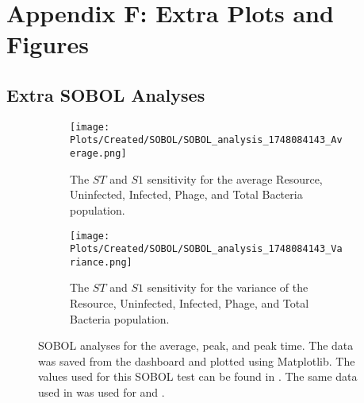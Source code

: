\chapter{Appendix F: Extra Plots and Figures}
\label{AppendixF}

\section{Extra SOBOL Analyses}
\label{sec:AppendixF:extra_SOBOL_analyses}

\begin{figure}[ht!]
    \centering
    \begin{subfigure}{0.49\linewidth}
        \centering
        \captionsetup{width=1\linewidth}
        \texttt{[image: Plots/Created/SOBOL/SOBOL\_analysis\_1748084143\_Average.png]}
        \caption{
            The $ST$ and $S1$ sensitivity for the average Resource, Uninfected, Infected, Phage, and Total Bacteria population. 
        }
        \label{fig:created:SOBOL_average_extra}
    \end{subfigure}
    \hfill
    \begin{subfigure}{0.49\linewidth}
        \centering
        \captionsetup{width=1\linewidth}
        \texttt{[image: Plots/Created/SOBOL/SOBOL\_analysis\_1748084143\_Variance.png]}
        \caption{
            The $ST$ and $S1$ sensitivity for the variance of the Resource, Uninfected, Infected, Phage, and Total Bacteria population. 
        }
        \label{fig:created:SOBOL_variance_extra}
    \end{subfigure}
    \caption{
        SOBOL analyses for the average, peak, and peak time. 
        The data was saved from the dashboard and plotted using Matplotlib. 
        The values used for this SOBOL test can be found in . 
        The same data used in  was used for  and . 
    }
    \label{fig:created:SOBOL_extra}
\end{figure}


